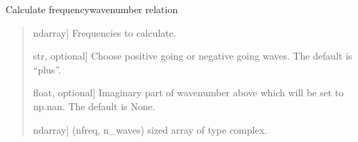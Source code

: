 \documentclass[letterpaper,10pt,english]{sphinxmanual}
\begin{document}
\begin{fulllineitems}
\begin{fulllineitems}
\end{fulllineitems}


\begin{fulllineitems}
\label{\detokenize{model:pywfe.Model.dispersion_relation}}
\pysigstartsignatures
{}
\pysigstopsignatures
\sphinxAtStartPar
Calculate frequency\sphinxhyphen{}wavenumber relation
\begin{quote}\begin{description}
\begin{description}
\sphinxlineitem{\sphinxstylestrong{frequency\_array}}{[}ndarray{]}
\sphinxAtStartPar
Frequencies to calculate.

\sphinxlineitem{\sphinxstylestrong{direction}}{[}str, optional{]}
\sphinxAtStartPar
Choose positive going or negative going waves. The default is “plus”.

\sphinxlineitem{\sphinxstylestrong{imag\_threshold}}{[}float, optional{]}
\sphinxAtStartPar
Imaginary part of wavenumber above which will be set to np.nan.
The default is None.

\end{description}

\begin{description}
\sphinxlineitem{\sphinxstylestrong{wavenumbers}}{[}ndarray{]}
\sphinxAtStartPar
(nfreq, n\_waves) sized array of type complex.

\end{description}

\end{description}\end{quote}

\end{fulllineitems}



\end{fulllineitems}
\end{document}
